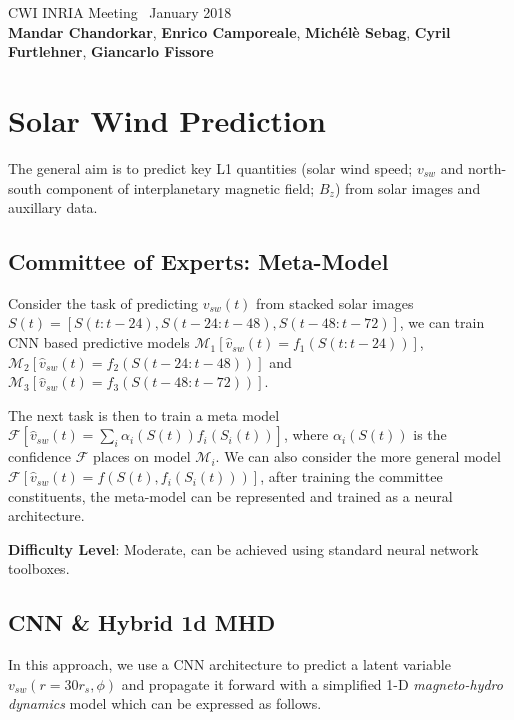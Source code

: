 \documentclass[]{book}
\theoremstyle{definition}
\begin{document}
\begin{center}
{\Large CWI INRIA Meeting \ January 2018}\\
\textbf{Mandar Chandorkar}, \textbf{Enrico Camporeale}, \textbf{Mich\'el\`e Sebag}, \textbf{Cyril Furtlehner}, \textbf{Giancarlo Fissore}
\end{center}

\vspace{0.2 cm}

\section{Solar Wind Prediction}

The general aim is to predict key L1 quantities (solar wind speed; $v_{sw}$ and north-south component of interplanetary magnetic field; $B_z$) from solar images and auxillary data. 

\subsection{Committee of Experts: Meta-Model}\label{model1}

Consider the task of predicting $v_{sw}(t)$ from stacked solar images $S(t) = [S(t:t-24), S(t-24:t-48), S(t-48:t-72)]$, we can train CNN based predictive models $\mathcal{M}_1[\hat{v}_{sw}(t) = f_{1}(S(t:t-24))]$, $\mathcal{M}_2[\hat{v}_{sw}(t) = f_{2}(S(t-24:t-48))]$ and $\mathcal{M}_3[\hat{v}_{sw}(t) = f_{3}(S(t-48:t-72))]$.

The next task is then to train a meta model $\mathcal{F}[\hat{v}_{sw}(t) = \sum_{i}{\alpha_{i}(S(t))f_{i}(S_{i}(t))}]$, where $\alpha_{i}(S(t))$ is the confidence $\mathcal{F}$ places on model $\mathcal{M}_i$. We can also consider the more general model $\mathcal{F}[\hat{v}_{sw}(t) = f(S(t), f_{i}(S_{i}(t)))]$, after training the committee constituents, the meta-model can be represented and trained as a neural architecture.

\textbf{Difficulty Level}: Moderate, can be achieved using standard neural network toolboxes. 

\subsection{CNN \& Hybrid 1d MHD}

In this approach, we use a CNN architecture to predict a latent variable $v_{sw}(r = 30r_s, \phi)$ and propagate it forward with a simplified 1-D \textit{magneto-hydro dynamics} model which can be expressed as follows.
\end{document}
